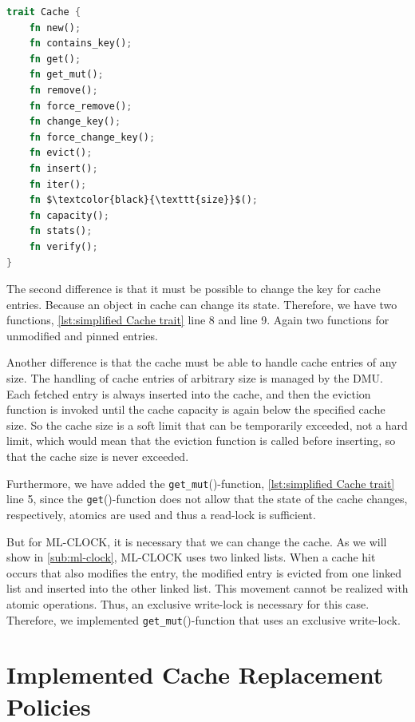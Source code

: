 \documentclass[
	12pt,
	a4paper,
	abstract,
	bibliography=totoc,
	chapterprefix,
	headings=openright,
	numbers=endperiod,
	parskip=half,
	twoside,
]{scrreprt}
\begin{document}
\bigskip

\begin{lstlisting}[language=Rust,mathescape=true,caption={Simplified Cache trait without type aliases, generics, function parameters and function return types.},label=lst:simplified Cache trait]
trait Cache {
    fn new();
    fn contains_key();
    fn get();
    fn get_mut();
    fn remove();
    fn force_remove();
    fn change_key();
    fn force_change_key();
    fn evict();
    fn insert();
    fn iter();
    fn $\textcolor{black}{\texttt{size}}$();
    fn capacity();
    fn stats();
    fn verify();
}
\end{lstlisting}

The second difference is that it must be possible to change the key for cache entries.
Because an object in cache can change its state. 
Therefore, we have two functions, \cref{lst:simplified Cache trait} line 8 and line 9. 
Again two functions for unmodified and pinned entries.

Another difference is that the cache must be able to handle cache entries of any size.
The handling of cache entries of arbitrary size is managed by the DMU.
Each fetched entry is always inserted into the cache, and then the eviction function is invoked 
until the cache capacity is again below the specified cache size.
So the cache size is a soft limit that can be temporarily exceeded, not a hard limit, which would mean that the 
eviction function is called before inserting, so that the cache size is never exceeded.

Furthermore, we have added the \texttt{get\_mut}()-function, \cref{lst:simplified Cache trait} line 5, 
since the \texttt{get}()-function does not allow that the state of the cache changes, 
respectively, atomics are used and thus a read-lock is sufficient.

But for ML-CLOCK, it is necessary that we can change the cache.
As we will show in \cref{sub:ml-clock}, ML-CLOCK uses two linked lists.
When a cache hit occurs that also modifies the entry,
the modified entry is evicted from one linked list and inserted into the other linked list.
This movement cannot be realized with atomic operations.
Thus, an exclusive write-lock is necessary for this case. 
Therefore, we implemented \texttt{get\_mut}()-function that uses an exclusive write-lock.


\section{Implemented Cache Replacement Policies}
\label{sec:implemented cache replacement policies}
\end{document}
